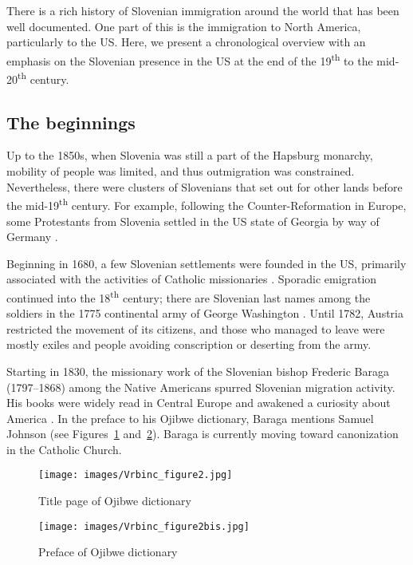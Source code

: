 \documentclass[output=paper,colorlinks,citecolor=brown,arabicfont,chinesefont]{langscibook}
\begin{document}
There is a rich history of Slovenian immigration around the world that has been well documented. One part of this is the immigration to North America, particularly to the US. Here, we present a chronological overview with an emphasis on the Slovenian presence in the US at the end of the 19\textsuperscript{th} to the mid-20\textsuperscript{th} century.

\subsection{The beginnings}

Up to the 1850s, when Slovenia was still a part of the Hapsburg monarchy, mobility of people was limited, and thus outmigration was constrained. Nevertheless, there were clusters of Slovenians that set out for other lands before the mid-19\textsuperscript{th} century. For example, following the Counter-Reformation in Europe, some Protestants from Slovenia settled in the US state of Georgia by way of Germany \citep{Zugel1987}. 

Beginning in 1680, a few Slovenian settlements were founded in the US, primarily associated with the activities of Catholic missionaries \citep{Gobetz2014}. Sporadic emigration continued into the 18\textsuperscript{th} century; there are Slovenian last names among the soldiers in the 1775 continental army of George Washington \citep{Prisland1950}. Until 1782,  Austria restricted the movement of its citizens, and those who managed to leave were mostly exiles and people avoiding conscription or deserting from the army.

Starting in 1830, the missionary work of the Slovenian bishop Frederic Baraga (1797–1868) among the Native Americans spurred Slovenian migration activity. His books were widely read in Central Europe and awakened a curiosity about America \citep{Mazi-leskovar2003}. In the preface to his Ojibwe dictionary, Baraga mentions Samuel Johnson (see Figures~\ref{vrbinc:fig2a} and~\ref{vrbinc:fig2b}). Baraga is currently moving toward canonization in the Catholic Church.

\begin{figure}
\texttt{[image: images/Vrbinc\_figure2.jpg]}
\caption{Title page of  Ojibwe dictionary}
\label{vrbinc:fig2a}
\end{figure}

\begin{figure}
\texttt{[image: images/Vrbinc\_figure2bis.jpg]}
\caption{Preface of  Ojibwe dictionary}
\label{vrbinc:fig2b}
\end{figure}
\end{document}
